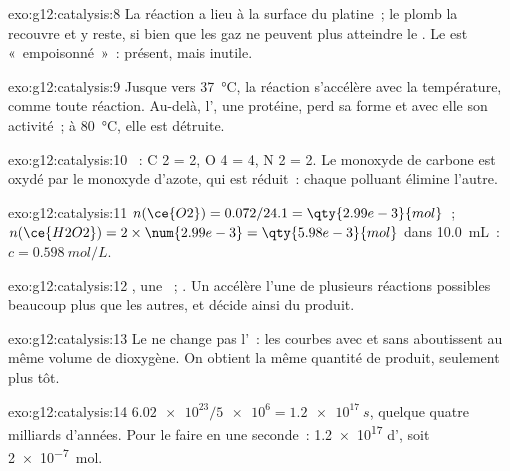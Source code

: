 \begin{solution}{exo:g12:catalysis:8}
La réaction a lieu à la surface du platine~; le plomb la recouvre et y
reste, si bien que les gaz ne peuvent plus atteindre le . Le
 est «~empoisonné~»~: présent, mais inutile.
\end{solution}

\begin{solution}{exo:g12:catalysis:9}
Jusque vers \qty{37}{\celsius}, la réaction s'accélère avec la
température, comme toute réaction. Au-delà, l', une protéine, perd
sa forme et avec elle son activité~; à \qty{80}{\celsius}, elle est
détruite.
\end{solution}

\begin{solution}{exo:g12:catalysis:10}
~: C 2 = 2, O 4 = 4, N 2 = 2. Le monoxyde de
carbone est oxydé par le monoxyde d'azote, qui est réduit~: chaque
polluant élimine l'autre.
\end{solution}

\begin{solution}{exo:g12:catalysis:11}
$n(\ce{O2}) = 0.072 / 24.1 = \qty{2.99e-3}{mol}$~;
$n(\ce{H2O2}) = 2 \times \num{2.99e-3} = \qty{5.98e-3}{mol}$ dans
\qty{10.0}{mL}~: $c = \qty{0.598}{mol/L}$.
\end{solution}

\begin{solution}{exo:g12:catalysis:12}
, une ~; .
Un  accélère l'une de plusieurs réactions possibles
beaucoup plus que les autres, et décide ainsi du produit.
\end{solution}

\begin{solution}{exo:g12:catalysis:13}
Le  ne change pas l'~: les courbes avec et sans
 aboutissent au même volume de dioxygène. On obtient la même
quantité de produit, seulement plus tôt.
\end{solution}

\begin{solution}{exo:g12:catalysis:14}
$\num{6.02e23} / \num{5e6} = \qty{1.2e17}{s}$, quelque quatre milliards
d'années. Pour le faire en une seconde~: \num{1.2e17} 
d', soit
\qty{2e-7}{mol}.
\end{solution}

